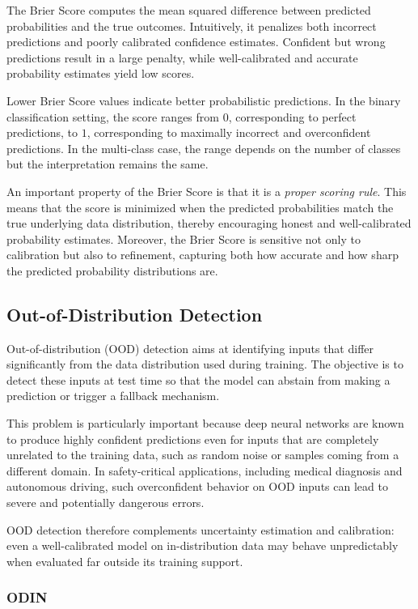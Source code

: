 The Brier Score computes the mean squared difference between predicted probabilities and the true outcomes. Intuitively, it penalizes both incorrect predictions and poorly calibrated confidence estimates. Confident but wrong predictions result in a large penalty, while well-calibrated and accurate probability estimates yield low scores.

Lower Brier Score values indicate better probabilistic predictions. In the binary classification setting, the score ranges from $0$, corresponding to perfect predictions, to $1$, corresponding to maximally incorrect and overconfident predictions. In the multi-class case, the range depends on the number of classes but the interpretation remains the same.

An important property of the Brier Score is that it is a \emph{proper scoring rule}. This means that the score is minimized when the predicted probabilities match the true underlying data distribution, thereby encouraging honest and well-calibrated probability estimates. Moreover, the Brier Score is sensitive not only to calibration but also to refinement, capturing both how accurate and how sharp the predicted probability distributions are.

\subsection{Out-of-Distribution Detection}

Out-of-distribution (OOD) detection aims at identifying inputs that differ significantly from the data distribution used during training. The objective is to detect these inputs at test time so that the model can abstain from making a prediction or trigger a fallback mechanism.

This problem is particularly important because deep neural networks are known to produce highly confident predictions even for inputs that are completely unrelated to the training data, such as random noise or samples coming from a different domain. In safety-critical applications, including medical diagnosis and autonomous driving, such overconfident behavior on OOD inputs can lead to severe and potentially dangerous errors.

OOD detection therefore complements uncertainty estimation and calibration: even a well-calibrated model on in-distribution data may behave unpredictably when evaluated far outside its training support.

\subsubsection{ODIN}

